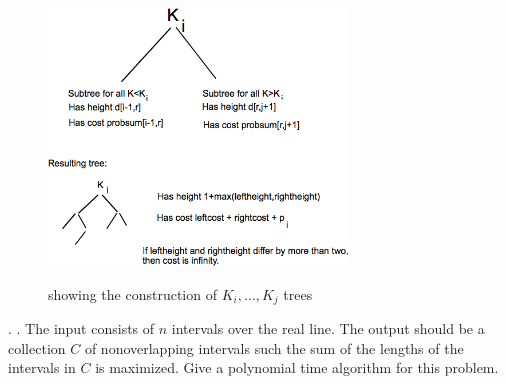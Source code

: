 \documentclass[10pt]{article}
\begin{document}
		\begin{figure}[h]
			\centering
				\includegraphics[width=300px]{dyn10.png}
			\label{fig:dyn10}
			\caption{showing the construction of $K_i, \ldots, K_j$ trees}
		\end{figure}
	\newpage
	.
	\newpage
	.	The input consists of $n$ intervals over the real line. The output should be a collection $C$  of nonoverlapping 
			intervals such the sum of the lengths of the intervals in $C$ is maximized. Give a polynomial
			time algorithm for this problem.\\
			\\
\end{document}
